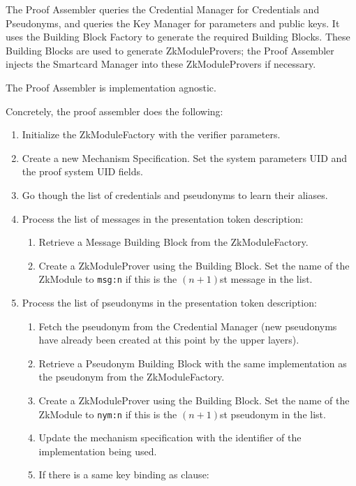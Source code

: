     The Proof Assembler queries the Credential Manager for Credentials and
    Pseudonyms, and queries the Key Manager for parameters and public keys.
    It uses the Building Block Factory to generate the required Building Blocks. These
    Building Blocks are used to generate ZkModuleProvers; the Proof Assembler
    injects the Smartcard Manager into these ZkModuleProvers if necessary.

    The Proof Assembler is implementation agnostic.

    Concretely, the proof assembler does the following:
    \begin{enumerate}
      \item Initialize the ZkModuleFactory with the verifier parameters.
      \item Create a new Mechanism Specification. Set the system parameters UID and the proof system UID fields.
      \item Go though the list of credentials and pseudonyms to learn their aliases.
      \item Process the list of messages in the presentation token description:
        \begin{enumerate}
          \item Retrieve a Message Building Block from the ZkModuleFactory.
          \item Create a ZkModuleProver using the Building Block. Set the name of the ZkModule to
            \texttt{msg:n} if this is the $(n+1)$st message in the list.
        \end{enumerate}
      \item Process the list of pseudonyms in the presentation token description:
        \begin{enumerate}
          \item Fetch the pseudonym from the Credential Manager (new pseudonyms have already been created at this point by the upper layers).
          \item Retrieve a Pseudonym Building Block with the same implementation as the pseudonym from the ZkModuleFactory.
          \item Create a ZkModuleProver using the Building Block. Set the name of the ZkModule to
            \texttt{nym:n} if this is the $(n+1)$st pseudonym in the list.
          \item Update the mechanism specification with the identifier of the implementation being used.
          \item If there is a same key binding as clause:

\end{enumerate}
\end{enumerate}
